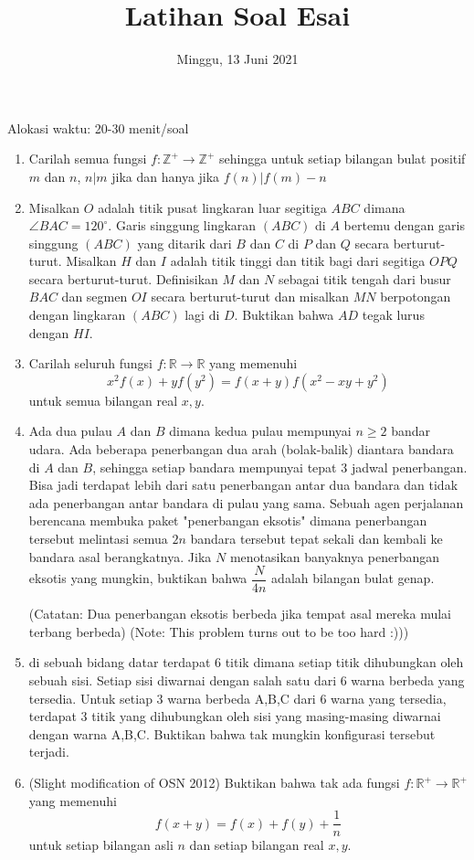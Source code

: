 \documentclass{article}
\title{Latihan Soal Esai}
\date{Minggu, 13 Juni 2021}
\begin{document}
	\maketitle
	

Alokasi waktu: 20-30 menit/soal
\begin{enumerate}
	\item Carilah semua fungsi $f:\mathbb{Z^+}\rightarrow\mathbb{Z^+}$ sehingga untuk setiap bilangan bulat positif $m$  dan $n$, $ n|m$ 
	jika dan hanya jika $f(n)| f(m)-n$
	
	
	\item Misalkan $O$ adalah titik pusat lingkaran luar segitiga $ABC$ dimana $\angle BAC = 120^\circ$. Garis singgung lingkaran $(ABC)$ di $A$ bertemu dengan garis singgung $(ABC)$ yang ditarik dari $B$ dan $C$ di $P$ dan $Q$ secara berturut-turut. Misalkan $H$ dan $I$ adalah titik tinggi dan titik bagi dari segitiga $OPQ$ secara berturut-turut. Definisikan $M$ dan $N$ sebagai titik tengah dari busur $BAC$ dan segmen $OI$ secara berturut-turut dan misalkan $MN$ berpotongan dengan lingkaran $(ABC)$ lagi di $D$. Buktikan bahwa $AD$ tegak lurus dengan $HI$.
	
	\item Carilah seluruh fungsi $f:\mathbb{R}\rightarrow\mathbb{R}$ yang memenuhi $$x^2f(x)+yf(y^2)=f(x+y)f(x^2-xy+y^2)$$
	untuk semua bilangan real $x,y$.
	
	
	\item Ada dua pulau $A$ dan $B$ dimana kedua pulau mempunyai $n\ge 2$ bandar udara. Ada beberapa penerbangan dua arah (bolak-balik) diantara bandara di $A$ dan $B$, sehingga setiap bandara mempunyai tepat 3 jadwal penerbangan. Bisa jadi terdapat lebih dari satu penerbangan antar dua bandara dan tidak ada penerbangan antar bandara di pulau yang sama. Sebuah agen perjalanan berencana membuka paket "penerbangan eksotis" dimana penerbangan tersebut melintasi semua $2n$ bandara tersebut tepat sekali dan kembali ke bandara asal berangkatnya. Jika $N$ menotasikan banyaknya penerbangan eksotis yang mungkin, buktikan bahwa $\dfrac{N}{4n}$ adalah bilangan bulat genap.
	
	(Catatan: Dua penerbangan eksotis berbeda jika tempat asal mereka mulai terbang berbeda)
	(Note: This problem turns out to be too hard :)))
	\newpage
	\item di sebuah bidang datar terdapat 6 titik dimana setiap titik dihubungkan oleh sebuah sisi. Setiap sisi diwarnai dengan salah satu dari 6 warna berbeda yang tersedia. Untuk setiap 3 warna berbeda A,B,C dari 6 warna yang tersedia, terdapat 3 titik yang dihubungkan oleh sisi yang masing-masing diwarnai dengan warna A,B,C. Buktikan bahwa tak mungkin konfigurasi tersebut terjadi.
	
	\item (Slight modification of OSN 2012) Buktikan bahwa tak ada fungsi $f:\mathbb{R}^+ \rightarrow \mathbb{R}^+$ yang memenuhi
	$$f(x+y)=f(x)+f(y)+\frac{1}{n}$$ untuk setiap bilangan asli $n$ dan setiap bilangan real $x,y$.
	
\end{enumerate}
\end{document}
